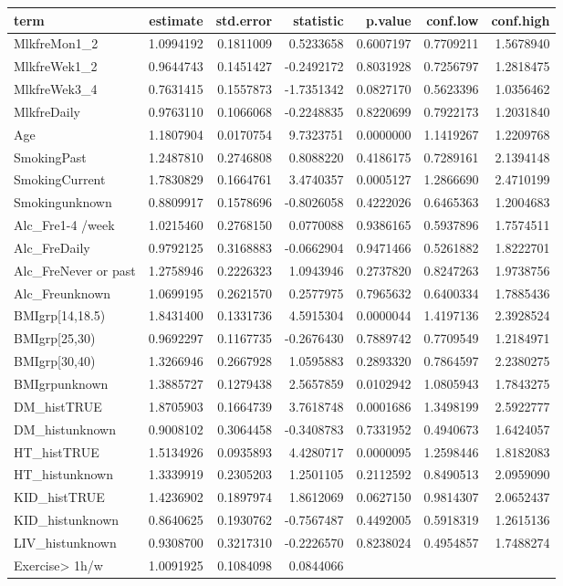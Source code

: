\documentclass[]{article}
\begin{document}
\begin{longtable}[]{@{}lrrrrrr@{}}
\toprule
term & estimate & std.error & statistic & p.value & conf.low &
conf.high\tabularnewline
\midrule
\endhead
MlkfreMon1\_2 & 1.0994192 & 0.1811009 & 0.5233658 & 0.6007197 &
0.7709211 & 1.5678940\tabularnewline
MlkfreWek1\_2 & 0.9644743 & 0.1451427 & -0.2492172 & 0.8031928 &
0.7256797 & 1.2818475\tabularnewline
MlkfreWek3\_4 & 0.7631415 & 0.1557873 & -1.7351342 & 0.0827170 &
0.5623396 & 1.0356462\tabularnewline
MlkfreDaily & 0.9763110 & 0.1066068 & -0.2248835 & 0.8220699 & 0.7922173
& 1.2031840\tabularnewline
Age & 1.1807904 & 0.0170754 & 9.7323751 & 0.0000000 & 1.1419267 &
1.2209768\tabularnewline
SmokingPast & 1.2487810 & 0.2746808 & 0.8088220 & 0.4186175 & 0.7289161
& 2.1394148\tabularnewline
SmokingCurrent & 1.7830829 & 0.1664761 & 3.4740357 & 0.0005127 &
1.2866690 & 2.4710199\tabularnewline
Smokingunknown & 0.8809917 & 0.1578696 & -0.8026058 & 0.4222026 &
0.6465363 & 1.2004683\tabularnewline
Alc\_Fre1-4 /week & 1.0215460 & 0.2768150 & 0.0770088 & 0.9386165 &
0.5937896 & 1.7574511\tabularnewline
Alc\_FreDaily & 0.9792125 & 0.3168883 & -0.0662904 & 0.9471466 &
0.5261882 & 1.8222701\tabularnewline
Alc\_FreNever or past & 1.2758946 & 0.2226323 & 1.0943946 & 0.2737820 &
0.8247263 & 1.9738756\tabularnewline
Alc\_Freunknown & 1.0699195 & 0.2621570 & 0.2577975 & 0.7965632 &
0.6400334 & 1.7885436\tabularnewline
BMIgrp{[}14,18.5) & 1.8431400 & 0.1331736 & 4.5915304 & 0.0000044 &
1.4197136 & 2.3928524\tabularnewline
BMIgrp{[}25,30) & 0.9692297 & 0.1167735 & -0.2676430 & 0.7889742 &
0.7709549 & 1.2184971\tabularnewline
BMIgrp{[}30,40) & 1.3266946 & 0.2667928 & 1.0595883 & 0.2893320 &
0.7864597 & 2.2380275\tabularnewline
BMIgrpunknown & 1.3885727 & 0.1279438 & 2.5657859 & 0.0102942 &
1.0805943 & 1.7843275\tabularnewline
DM\_histTRUE & 1.8705903 & 0.1664739 & 3.7618748 & 0.0001686 & 1.3498199
& 2.5922777\tabularnewline
DM\_histunknown & 0.9008102 & 0.3064458 & -0.3408783 & 0.7331952 &
0.4940673 & 1.6424057\tabularnewline
HT\_histTRUE & 1.5134926 & 0.0935893 & 4.4280717 & 0.0000095 & 1.2598446
& 1.8182083\tabularnewline
HT\_histunknown & 1.3339919 & 0.2305203 & 1.2501105 & 0.2112592 &
0.8490513 & 2.0959090\tabularnewline
KID\_histTRUE & 1.4236902 & 0.1897974 & 1.8612069 & 0.0627150 &
0.9814307 & 2.0652437\tabularnewline
KID\_histunknown & 0.8640625 & 0.1930762 & -0.7567487 & 0.4492005 &
0.5918319 & 1.2615136\tabularnewline
LIV\_histunknown & 0.9308700 & 0.3217310 & -0.2226570 & 0.8238024 &
0.4954857 & 1.7488274\tabularnewline
Exercise\textgreater{} 1h/w & 1.0091925 & 0.1084098 & 0.0844066 &

\end{longtable}
\end{document}
